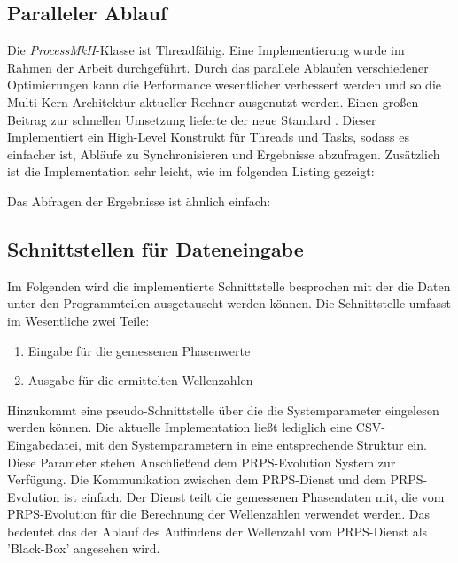 \subsection{Paralleler Ablauf}
\label{parallel_computing}
%
Die \textit{ProcessMkII}-Klasse ist Threadfähig. Eine Implementierung wurde im Rahmen der Arbeit durchgeführt. Durch das parallele Ablaufen verschiedener Optimierungen kann die Performance wesentlicher verbessert werden und so die Multi-Kern-Architektur aktueller Rechner ausgenutzt werden. Einen großen Beitrag zur schnellen Umsetzung lieferte der neue Standard . Dieser Implementiert ein High-Level Konstrukt für Threads und Tasks, sodass es einfacher ist, Abläufe zu Synchronisieren und Ergebnisse abzufragen. Zusätzlich ist die Implementation sehr leicht, wie im folgenden Listing gezeigt:
%

				 \label{lst:Parallel_example1.cpp}
%
\vspace{2mm}
Das Abfragen der Ergebnisse ist ähnlich einfach:
\vspace{2mm}
%

				 \label{lst:Parallel_example2.cpp}
%
\vspace{2mm}
%
\subsection{Schnittstellen für Dateneingabe}
%
Im Folgenden wird die implementierte Schnittstelle besprochen mit der die Daten unter den Programmteilen ausgetauscht werden können. Die Schnittstelle umfasst im Wesentliche zwei Teile:
\begin{enumerate}
	\item Eingabe für die gemessenen Phasenwerte
	\item Ausgabe für die ermittelten Wellenzahlen
\end{enumerate}
%
Hinzukommt eine pseudo-Schnittstelle über die die Systemparameter eingelesen werden können. Die aktuelle Implementation ließt lediglich eine CSV-Eingabedatei, mit den Systemparametern in eine entsprechende Struktur ein. Diese Parameter stehen Anschließend dem PRPS-Evolution System zur Verfügung.
%
Die Kommunikation zwischen dem PRPS-Dienst und dem PRPS-Evolution ist einfach. Der Dienst teilt die gemessenen Phasendaten mit, die vom PRPS-Evolution für die Berechnung der Wellenzahlen verwendet werden. Das bedeutet das der Ablauf des Auffindens der Wellenzahl vom PRPS-Dienst als 'Black-Box' angesehen wird.\\
%
